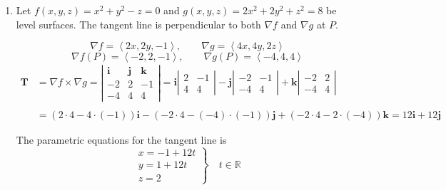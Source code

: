\documentclass[a4paper, 12pt]{article}
\begin{document}
\begin{enumerate}[leftmargin=*,label=\textbf{\arabic*.}]
The result is then

\[\left.\frac{dz}{dt}\right|_{t=0}=-\cos0=\boxed{-1}\]

\item Let $f(x,y,z)=x^2+y^2-z=0$ and $g(x,y,z)=2x^2+2y^2+z^2=8$ be level surfaces. The tangent line is perpendicular to both $\nabla f$ and $\nabla g$ at $P$.

\[\nabla f=\left\langle2x,2y,-1\right\rangle,\qquad\nabla g=\left\langle4x,4y,2z\right\rangle\]
\[\nabla f(P)=\left\langle-2,2,-1\right\rangle,\qquad\nabla g(P)=\left\langle-4,4,4\right\rangle\]
\begin{align*}\mathbf{T}&=\nabla f\times\nabla g=\left|\begin{array}{ccc}
\mathbf{i}&\mathbf{j}&\mathbf{k}\\
-2&2&-1\\
-4&4&4
\end{array}\right|=\mathbf{i}\left|\begin{array}{cc}
2&-1\\4&4
\end{array}\right|-\mathbf{j}\left|\begin{array}{cc}
-2&-1\\-4&4
\end{array}\right|+\mathbf{k}\left|\begin{array}{cc}
-2&2\\-4&4
\end{array}\right|\\\\&=(2\cdot4-4\cdot(-1))\mathbf{i}-(-2\cdot4-(-4)\cdot(-1))\mathbf{j}+(-2\cdot4-2\cdot(-4))\mathbf{k}=12\mathbf i+12\mathbf j\end{align*}

The parametric equations for the tangent line is
\[\boxed{\left.\begin{array}{l}
x=-1+12t\\
y=1+12t\\
z=2
\end{array}\right\}\quad t\in\mathbb{R}}\]

\end{enumerate}

\newpage
{}
{}


\end{document}

